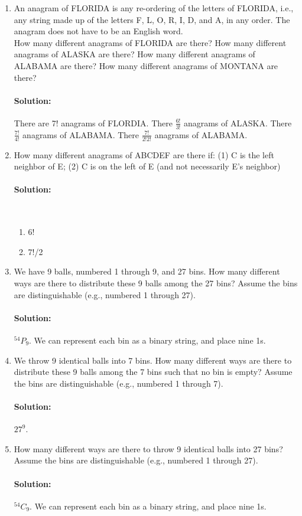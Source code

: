 \documentclass[11pt, notitlepage]{article}
\newcommand*{\Perm}[2]{{}^{#1}\!P_{#2}}%
\newcommand*{\Comb}[2]{{}^{#1}C_{#2}}%
\newenvironment{solution}{\paragraph{Solution:}}{\hfill}
\begin{document}
\begin{enumerate}[label=\alph*.)]
\item An anagram of FLORIDA is any re-ordering of the letters of FLORIDA, i.e., any
  string made up of the letters F, L, O, R, I, D, and A, in any order.
  The anagram does not have to be an English word. \\
  How many different anagrams of FLORIDA are there? How many different anagrams 
  of ALASKA are there? How many different anagrams of ALABAMA are there? 
  How many different anagrams of MONTANA are there?
\begin{solution}
	There are 7! anagrams of FLORDIA. There $\frac{6!}{3!}$ anagrams of ALASKA. There $\frac{7!}{4!}$ anagrams of ALABAMA. There $\frac{7!}{2!2!}$ anagrams of ALABAMA. 
\end{solution}
\newpage
\item How many  different anagrams of ABCDEF are there if: (1) C is the left neighbor of E; (2) C is on the left of E (and not necessarily E's neighbor)
\begin{solution}\
	\begin{enumerate}[label=(\arabic*):]
	\item 6!
	\item 7!/2
	\end{enumerate}
\end{solution}

\item We have 9 balls, numbered 1 through 9, and 27 bins.
  How many different ways are there to distribute these 9 balls among
  the 27 bins? Assume the bins are distinguishable (e.g., numbered 1
  through 27).
\begin{solution}
	$\Perm{54}{9}$. We can represent each bin as a binary string, and place nine 1s.
\end{solution}
  
\item We throw 9 identical balls into 7 bins.
  How many different ways are there to distribute these 9 balls among
  the 7 bins such that no bin is empty? Assume the bins are
  distinguishable (e.g., numbered 1 through 7).
\begin{solution}
	$27^9$. 
\end{solution}
  
\item How many different ways are there to throw 9 identical balls
  into 27 bins? Assume the bins are distinguishable (e.g., numbered 1
  through 27).
\begin{solution}
	$\Comb{54}{9}$. We can represent each bin as a binary string, and place nine 1s.
\end{solution}
 

\end{enumerate}
\end{document}
